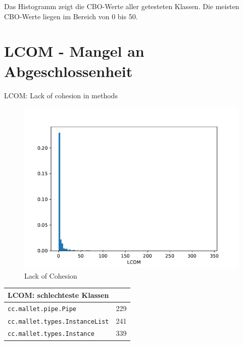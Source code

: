 \documentclass{scrreprt}
\newcommand{\lstx}[1]{\lstinline$#1$}
\begin{document}
Das Histogramm zeigt die CBO-Werte aller getesteten Klassen. Die meisten CBO-Werte liegen im Bereich von 0 bis 50.

\section{LCOM - Mangel an Abgeschlossenheit}

LCOM: Lack of cohesion in methods

\begin{figure}
 \centering
 \includegraphics[width=.8\textwidth]{./LCOM.pdf}
 \caption{Lack of Cohesion}
 \label{abb:lcom}
\end{figure}


\begin{center}
\end{center}


\begin{center}
\begin{tabular}{ll}
\toprule
LCOM: schlechteste Klassen \\
\midrule
\lstx{cc.mallet.pipe.Pipe} & 229\\
\lstx{cc.mallet.types.InstanceList} & 241\\
\lstx{cc.mallet.types.Instance} & 339 \\
\bottomrule
\end{tabular}
\end{center}
\end{document}

